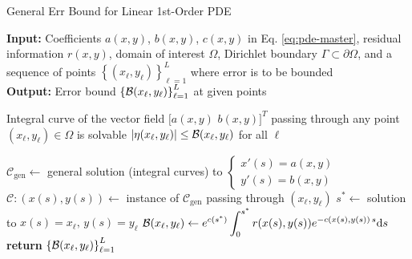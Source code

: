     \makeatletter
    \setlength{\@fptop}{0pt}
    \begin{algorithm}
        \caption{General Err Bound for Linear 1st-Order PDE}\label{alg:linear-first-order-pde-general}
        \textbf{Input:} Coefficients $a(x, y)$, $b(x, y)$, $c(x, y)$ in Eq. \eqref{eq:pde-master}, residual information $r(x, y)$, domain of interest $\Omega$, Dirichlet boundary $\Gamma\subset \partial \Omega$, and a sequence of points $\left\{(x_\ell, y_\ell)\right\}_{\ell=1}^{L}$ where error is to be bounded\\
        \textbf{Output:} Error bound $\left\{\mathcal{B}(x_\ell, y_\ell)\right\}_{\ell=1}^{L}$ at given points
        \begin{algorithmic}
            \Require Integral curve of the vector field $\big[a(x, y)\,\, b(x, y)\big]^T$ passing through any point $(x_\ell, y_\ell) \in \Omega$ is solvable
            \Ensure $|\eta(x_\ell, y_\ell)| \leq \mathcal{B}(x_\ell, y_\ell)$ for all $\ell$

            \State $\mathcal{C}_{\text{gen}} \gets $ general solution (integral curves) to {$\begin{cases}x'(s) = a(x, y) \\ y'(s) = b(x, y)\end{cases}$}
                \State $\mathcal{C}:(x(s), y(s))\gets$ instance of $\mathcal{C}_{\text{gen}}$ passing through $(x_\ell, y_\ell)$
                \State $s^* \gets$ solution to $x(s) = x_\ell,\, y(s)=y_\ell$
                \State $\displaystyle \mathcal{B}(x_\ell, y_\ell) \gets e^{c(s^*)}\int_{0}^{s^*}r(x(s), y(s)) e^{-c(x(s),y(s))\,s}\mathrm{d}s$ 
            \EndFor
            \State \textbf{return} $\left\{\mathcal{B}(x_\ell, y_\ell)\right\}_{\ell=1}^{L}$
        \end{algorithmic}
    \end{algorithm}
    \makeatother